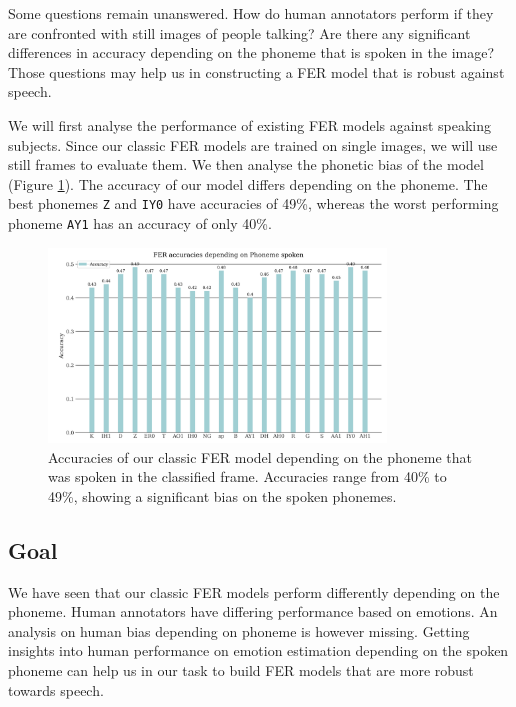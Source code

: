 Some questions remain unanswered. How do human annotators perform if they are confronted with still images of people talking? Are there any significant differences in accuracy depending on the phoneme that is spoken in the image? Those questions may help us in constructing a FER model that is robust against speech. 

We will first analyse the performance of existing FER models against speaking subjects. Since our classic FER models are trained on single images, we will use still frames to evaluate them. We then analyse the phonetic bias of the model (Figure \ref{fig:phone_acc_ravdess}). The accuracy of our model differs depending on the phoneme. The best phonemes \texttt{Z} and \texttt{IY0} have accuracies of 49\%, whereas the worst performing phoneme \texttt{AY1} has an accuracy of only 40\%.
\begin{figure}
    \centering
    \includegraphics[width=0.8\textwidth]{res/FERvsPHONE.png}
    \caption{Accuracies of our classic FER model depending on the phoneme that was spoken in the classified frame. Accuracies range from 40\% to 49\%, showing a significant bias on the spoken phonemes.}
    \label{fig:phone_acc_ravdess}
\end{figure}
\subsection{Goal}
We have seen that our classic FER models perform differently depending on the phoneme. Human annotators have differing performance based on emotions. An analysis on human bias depending on phoneme is however missing. Getting insights into human performance on emotion estimation depending on the spoken phoneme can help us in our task to build FER models that are more robust towards speech.

